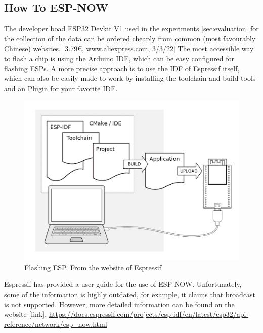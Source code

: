\subsection*{How To ESP-NOW}

The developer boad ESP32 Devkit V1 used in the experiments \cref{sec:evaluation} for the collection of the data
can be ordered cheaply from common (most favourably Chinese) websites. [3.79€, www.aliexpress.com, 3/3/22]
The most accessible way to flash a chip is using the Arduino IDE, which can be easy configured for flashing ESPs.
A more precise approach is to use the IDF of Espressif itself, 
which can also be easily made to work by installing the toolchain and build tools and an Plugin for your favorite IDE.

\begin{figure}[h]
	\centering
	\includegraphics[scale=0.4]{figures/ESP-ISF.png}
	\caption{Flashing ESP. From the website of Espressif}
	\label{fig:ESP-IDF}
\end{figure}

Espressif has provided a user guide for the use of ESP-NOW.
Unfortunately, some of the information is highly outdated, for example, it claims that broadcast is not supported.
However, more detailed information can be found on the website [link].
\url{https://docs.espressif.com/projects/esp-idf/en/latest/esp32/api-reference/network/esp_now.html}


